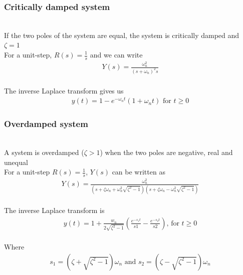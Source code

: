 \begin{frame}
\frametitle{Critically damped system}

\\ If the two poles of the system are equal, the system is critically damped and $\zeta=1$
\vspace{0.75cm}
\pause
\\ For a unit-step, $R(s)=\frac{1}{s}$ and we can write
\begin{align*}
Y(s) =\frac{\omega_n ^2}{(s+\omega_n)^2 s}
\end{align*}
\pause
\\ The inverse Laplace transform gives us
\begin{align*}
y(t) = 1 - e^{-\omega_n t}(1+\omega_n t) \text{ for } t\ge 0
\end{align*}         
\end{frame}

\begin{frame}
\frametitle{Overdamped system}
\\ A system is overdamped ($\zeta>1$) when the two poles are negative, real and unequal
\vspace{0.25cm}
\pause
\\ For a unit-step $R(s)=\frac{1}{s}$, $Y(s)$ can be written as
\\ \vspace{-0.5cm}
\begin{align*}
Y(s) = \frac{\omega_n ^2}{(s+\zeta\omega_n + \omega_n ^2\sqrt{\zeta^2 -1})(s+\zeta\omega_n - \omega_n ^2\sqrt{\zeta^2 -1})}
\end{align*} 
\pause
\\ The inverse Laplace transform is
\\ \vspace{-0.5cm}
\begin{align*}
y(t) = 1 +\frac{w_n}{2\sqrt{\zeta^2-1}}(\frac{e^{-s_1 t}}{s1} - \frac{e^{-s_2 t}}{s2})\text{, for } t\ge 0
\end{align*}
\pause
\\ Where
\\ \vspace{-0.5cm}
\begin{align*}
s_1 = (\zeta +\sqrt{\zeta^2 -1})\omega_n\text{ and } s_2 = (\zeta -\sqrt{\zeta^2 -1})\omega_n
\end{align*}
\end{frame}


